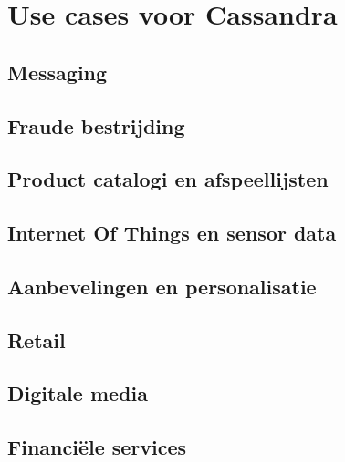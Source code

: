 \chapter{Use cases voor Cassandra}
\label{ch:cassandra_ucs}

\section{Messaging}

\section{Fraude bestrijding}

\section{Product catalogi en afspeellijsten}

\section{Internet Of Things en sensor data}

\section{Aanbevelingen en personalisatie}

\section{Retail}

\section{Digitale media}

\section{Financiële services}
